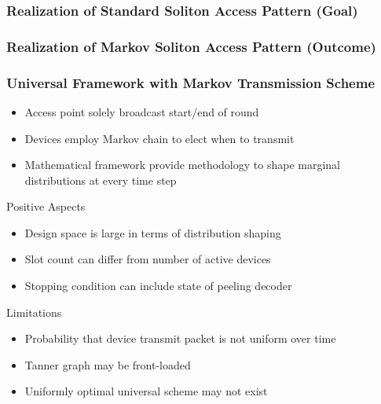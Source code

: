 \documentclass[10pt]{beamer}
\begin{document}
\begin{frame}
\frametitle{Realization of Standard Soliton Access Pattern (Goal)}
\begin{center}
  \scalebox{0.6}{}
\end{center}
\vfill
\begin{center}
  \scalebox{0.8}{}
\end{center}
\end{frame}


\begin{frame}
\frametitle{Realization of Markov Soliton Access Pattern (Outcome)}
\begin{center}
  \scalebox{0.6}{}
\end{center}
\vfill
\begin{center}
  \scalebox{0.8}{}
\end{center}
\end{frame}


\begin{frame}
\frametitle{Universal Framework with Markov Transmission Scheme}
\begin{itemize}
\item Access point solely broadcast start/end of round
\item Devices employ Markov chain to elect when to transmit
\item Mathematical framework provide methodology to shape marginal distributions at every time step
\end{itemize}
\begin{block}{Positive Aspects}
\begin{itemize}
\item Design space is large in terms of distribution shaping
\item Slot count can differ from number of active devices
\item Stopping condition can include state of peeling decoder
\end{itemize}
\end{block}
\begin{block}{Limitations}
\begin{itemize}
\item Probability that device transmit packet is not uniform over time
\item Tanner graph may be front-loaded
\item Uniformly optimal universal scheme may not exist 
\end{itemize}
\end{block}
\end{frame}
\end{document}
